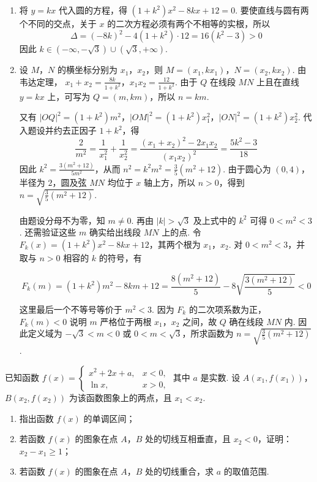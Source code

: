 \begin{solution}
\begin{enumerate}
\item 将 \(y=kx\) 代入圆的方程，得
\((1+k^2)x^2-8kx+12=0\). 要使直线与圆有两个不同的交点，关于 \(x\) 的二次方程必须有两个不相等的实根，所以
\[\Delta=(-8k)^2-4(1+k^2)\cdot12=16(k^2-3)>0\]
因此 \(k\in(-\infty,-\sqrt3)\cup(\sqrt3,+\infty)\).

\item 设 \(M\)，\(N\) 的横坐标分别为 \(x_1\)，\(x_2\)，则 \(M=(x_1,kx_1)\)，\(N=(x_2,kx_2)\). 由韦达定理，
\(x_1+x_2=\frac{8k}{1+k^2}\)，\(x_1x_2=\frac{12}{1+k^2}\). 由于 \(Q\) 在线段 \(MN\) 上且在直线 \(y=kx\) 上，可写为 \(Q=(m,km)\)，所以 \(n=km\).

又有 \(|OQ|^2=(1+k^2)m^2\)，\(|OM|^2=(1+k^2)x_1^2\)，\(|ON|^2=(1+k^2)x_2^2\). 代入题设并约去正因子 \(1+k^2\)，得
\[
\frac{2}{m^2}=\frac{1}{x_1^2}+\frac{1}{x_2^2}=\frac{(x_1+x_2)^2-2x_1x_2}{(x_1x_2)^2}=\frac{5k^2-3}{18}
\]
因此 \(k^2=\frac{3(m^2+12)}{5m^2}\)，从而
\(n^2=k^2m^2=\frac35(m^2+12)\). 由于圆心为 \((0,4)\)，半径为 \(2\)，圆及弦 \(MN\) 均位于 \(x\) 轴上方，所以 \(n>0\)，得到
\(n=\sqrt{\frac35(m^{2}+12)}\).

由题设分母不为零，知 \(m\neq0\). 再由 \(|k|>\sqrt3\) 及上式中的 \(k^2\) 可得 \(0<m^2<3\). 还需验证这些 \(m\) 确实给出线段 \(MN\) 上的点. 令
\(F_k(x)=(1+k^2)x^2-8kx+12\)，其两个根为 \(x_1\)，\(x_2\). 对 \(0<m^2<3\)，并取与 \(n>0\) 相容的 \(k\) 的符号，有

\[
F_k(m)=(1+k^2)m^2-8km+12
=\frac{8(m^2+12)}5-8\sqrt{\frac{3(m^2+12)}5}<0
\]

这里最后一个不等号等价于 \(m^2<3\). 因为 \(F_k\) 的二次项系数为正，\(F_k(m)<0\) 说明 \(m\) 严格位于两根 \(x_1\)，\(x_2\) 之间，故 \(Q\) 确在线段 \(MN\) 内. 因此定义域为
\(-\sqrt3<m<0\) 或 \(0<m<\sqrt3\)，所求函数为
\(n=\sqrt{\frac35(m^2+12)}\).
\end{enumerate}
\end{solution}

\begin{problem}
已知函数 \(f(x)=\begin{cases}
x^2+2x+a,&x<0,\\
\ln x,&x>0,
\end{cases}\) 其中 \(a\) 是实数. 设 \(A(x_1,f(x_1))\)，\(B(x_2,f(x_2))\) 为该函数图象上的两点，且 \(x_1<x_2\).
\begin{enumerate}
\item 指出函数 \(f(x)\) 的单调区间；
\item 若函数 \(f(x)\) 的图象在点 \(A\)，\(B\) 处的切线互相垂直，且 \(x_2<0\)，证明：\(x_2-x_1\geqslant1\)；
\item 若函数 \(f(x)\) 的图象在点 \(A\)，\(B\) 处的切线重合，求 \(a\) 的取值范围.
\end{enumerate}
\end{problem}

